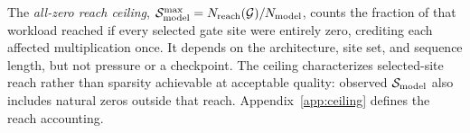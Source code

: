 The \emph{all-zero reach ceiling},
$\mathcal{S}_{\mathrm{model}}^{\max}=N_{\mathrm{reach}}(\mathcal{G})/N_{\mathrm{model}}$, counts the fraction
of that workload reached if every selected gate site were entirely zero,
crediting each affected multiplication once. It depends on the architecture,
site set, and sequence length, but not pressure or a checkpoint. The ceiling
characterizes selected-site reach rather than sparsity achievable at acceptable
quality: observed $\mathcal{S}_{\mathrm{model}}$ also includes natural zeros outside that reach.
Appendix~\ref{app:ceiling} defines the reach accounting.
